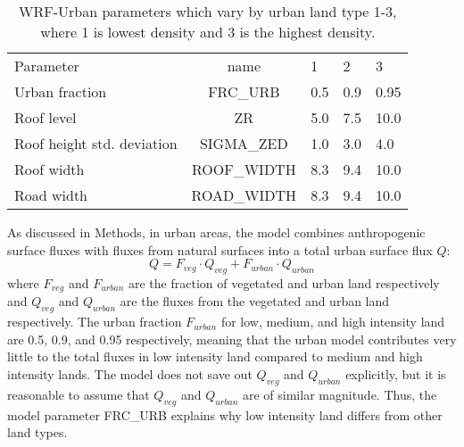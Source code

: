 \documentclass[draft,linenumbers]{agujournal}
\begin{document}
\begin{table}
\begin{tabular}{lclll}
Parameter & name & 1 & 2 & 3 \\
Urban fraction &  \textsc{FRC\_URB} & 0.5 & 0.9 & 0.95 \\
Roof level &\textsc{ZR} &5.0&  7.5 & 10.0 \\
Roof height std. deviation & \textsc{SIGMA\_ZED} & 1.0 &  3.0 &  4.0\\
Roof width &  \textsc{ROOF\_WIDTH} & 8.3& 9.4 & 10.0 \\
Road width & \textsc{ROAD\_WIDTH} &  8.3&  9.4&  10.0 
\end{tabular} 
\caption{WRF-Urban parameters which vary by urban land type 1-3, where 1 is lowest density and 3 is the highest density.}
\label{tab:urban_model}
\end{table}

As discussed in Methods, in urban areas, the model combines anthropogenic surface fluxes with fluxes from natural surfaces into a total urban surface flux $Q$:
$$ Q= F_{veg} \cdot Q_{veg} + F_{urban} \cdot Q_{urban}$$
where $F_{veg}$ and $F_{urban}$ are the fraction of vegetated and urban land respectively and $Q_{veg}$ and $Q_{urban}$ are the fluxes from the vegetated and urban land respectively. 
The urban fraction $F_{urban}$ for low, medium, and high intensity land are 0.5, 0.9, and 0.95 respectively, meaning that the urban model contributes very little to the total fluxes in low intensity land compared to medium and high intensity lands.
The model does not save out $Q_{veg}$ and $Q_{urban}$ explicitly, but it is reasonable to assume that $Q_{veg}$ and $Q_{urban}$ are of similar magnitude. Thus, the model parameter \textsc{FRC\_URB} explains why low intensity land differs from other land types. 
\end{document}

